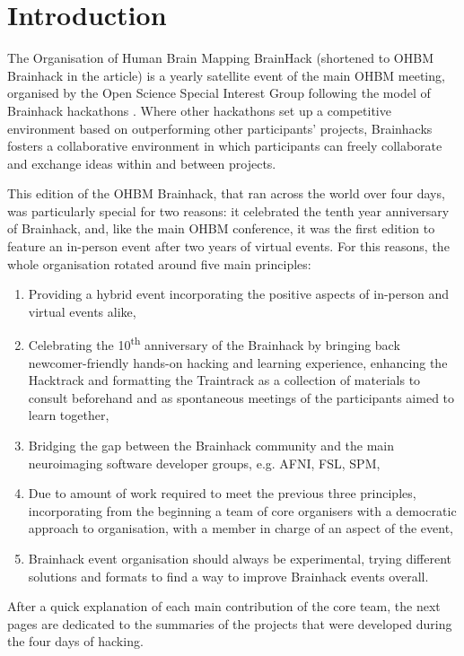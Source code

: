 \documentclass[10pt,a4paper,twocolumns]{proc}
\begin{document}
\section*{Introduction}

The Organisation of Human Brain Mapping BrainHack (shortened to OHBM
Brainhack in the article) is a yearly satellite event of the main OHBM
meeting, organised by the Open Science Special Interest Group following
the model of Brainhack hackathons \parencite{Gau2021}.
Where other hackathons set up a competitive environment based on
outperforming other participants' projects, Brainhacks fosters a
collaborative environment in which participants can freely collaborate
and exchange ideas within and between projects.

This edition of the OHBM Brainhack, that ran across the world over four
days, was particularly special for two reasons: it celebrated the tenth
year anniversary of Brainhack, and, like the main OHBM conference, it
was the first edition to feature an in-person event after two years of
virtual events. For this reasons, the whole organisation rotated around
five main principles:

\begin{enumerate}
\tightlist
\item
  Providing a hybrid event incorporating the positive aspects of
  in-person and virtual events alike,
\item
  Celebrating the 10\textsuperscript{th} anniversary of the
  Brainhack by bringing back newcomer-friendly hands-on hacking and
  learning experience, enhancing the Hacktrack and formatting the
  Traintrack as a collection of materials to consult beforehand and as
  spontaneous meetings of the participants aimed to learn together,
\item
  Bridging the gap between the Brainhack community and the main
  neuroimaging software developer groups, e.g. AFNI, FSL, SPM,
\item
  Due to amount of work required to meet the previous three principles,
  incorporating from the beginning a team of core organisers with a
  democratic approach to organisation, with a member in charge of an
  aspect of the event,
\item
  Brainhack event organisation should always be experimental, trying
  different solutions and formats to find a way to improve Brainhack
  events overall. 
\end{enumerate}

After a quick explanation of each main contribution of the core team, the next pages are dedicated to the summaries of the projects that were developed during the four days of hacking.
\end{document}
